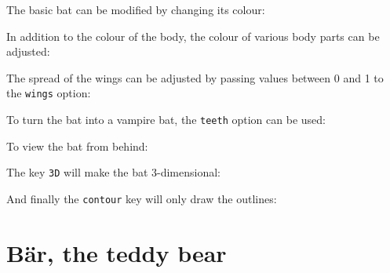 \documentclass[parskip=half]{scrartcl}
\begin{document}
The basic bat can be modified by changing its colour:
\begin{tcblisting}{}
\bat[body=blue]
\end{tcblisting}

In addition to the colour of the body, the colour of various body parts can be adjusted:
\begin{tcblisting}{}
\bat[eye=red]
\end{tcblisting}
\begin{tcblisting}{}
\bat[pupil=red]
\end{tcblisting}
\begin{tcblisting}{}
\bat[mouth=red]
\end{tcblisting}
\begin{tcblisting}{}
\bat[ears=blue]
\end{tcblisting}
\begin{tcblisting}{}
\bat[feet=blue]
\end{tcblisting}

The spread of the wings can be adjusted by passing values between 0 and 1 to the \lstinline|wings| option:
\begin{tcblisting}{}
\bat[wings=0.5]
\end{tcblisting}

To turn the bat into a vampire bat, the \lstinline|teeth| option can be used:
\begin{tcblisting}{}
\bat[teeth=white]
\end{tcblisting}

To view the bat from behind:
\begin{tcblisting}{}
\bat[back]
\end{tcblisting}

The key \lstinline|3D| will make the bat 3-dimensional:
\begin{tcblisting}{}
\bat[3D]
\end{tcblisting}

And finally the \lstinline|contour| key will only draw the outlines:
\begin{tcblisting}{}
\bat[contour=black]
\end{tcblisting}

%
%
\clearpage
\section[Bear]{B\"ar, the teddy bear}
\end{document}
